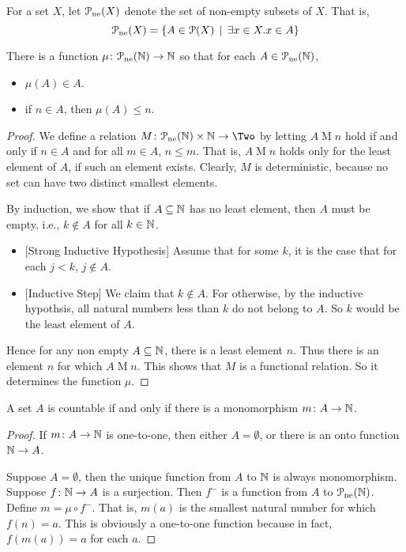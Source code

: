 \begin{defn}
	For a set $X$, let ${\mathcal{P}}_{\text{ne}}(X)$ denote the set of non-empty subsets of $X$. That is, \[{\mathcal{P}}_{\text{ne}}(X) = \{A\in{\mathcal{P}}(X)\,\mid\, \exists x\in X.x\in A\}\]
\end{defn}

\begin{lemma}
	There is a function ${\mu}\colon{{\mathcal{P}}_{\text{ne}}(\mathbb N)}\to{\mathbb N}$ so that for each $A\in {\mathcal{P}}_{\text{ne}}(\mathbb N)$, 
	\begin{itemize}
		\item $\mu(A)\in A$.
		\item if $n\in A$, then $\mu(A)\leq n$.
	\end{itemize}
	
	\begin{proof}
		We define a relation $\fromto M{\powerset_{\text{ne}}(\NN)\times \NN}
		\Two$
		by letting $A\mathrel{M} n$ hold if and only if $n\in A$ and for all $m\in A$, $n\leq m$. That is, $A\mathrel{M} n$ holds only for the least element of $A$, if such an element exists. Clearly, $M$ is deterministic, because no set can have two distinct smallest elements.
		
		By induction, we show that if $A\subseteq \mathbb N$ has no least element, then $A$ must be empty, i.e., $k\notin A$ for all $k\in \mathbb N$.
		\begin{itemize}
			\item{}[Strong Inductive Hypothesis] Assume that for some $k$, it is the case that for each $j<k$, $j\notin A$. 
			\item{}[Inductive Step] We claim that $k\notin A$. For otherwise, by the inductive hypothsis, all natural numbers less than $k$ do not belong to $A$. So $k$ would be the least element of $A$. 
		\end{itemize} 
		Hence for any non empty $A\subseteq \mathbb N$, there is a least element $n$. Thus there is an element $n$ for which $A\mathrel{M}n$. This shows that $M$ is a functional relation. So it determines the function $\mu$.
	\end{proof}
\end{lemma}

\begin{lemma}
	A set $A$ is countable if and only if there is a monomorphism ${m}\colon{A}\to{\mathbb N}$. 
	
	\begin{proof}
		If ${m}\colon{A}\to{\mathbb N}$ is one-to-one, then either $A=\emptyset$, or there is an onto function $\mathbb N\to A$.
		
		Suppose $A=\emptyset$, then the unique function from $A$ to $\mathbb N$ is always monomorphism. Suppose ${f}\colon{\mathbb N}\to{A}$ is a surjection. Then 
		$f^-$ is a function from $A$ to ${\mathcal{P}}_{\text{ne}}(\mathbb N)$. Define $m = \mu\circ f^-$. That is, $m(a)$ is the smallest natural number for which $f(n)=a$. This is obviously a one-to-one function because in fact, $f(m(a))=a$ for each $a$.
	\end{proof}
\end{lemma}




